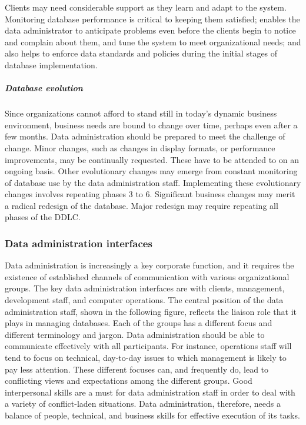 \documentclass[
]{article}
\begin{document}
Clients may need considerable support as they learn and adapt to the
system. Monitoring database performance is critical to keeping them
satisfied; enables the data administrator to anticipate problems even
before the clients begin to notice and complain about them, and tune the
system to meet organizational needs; and also helps to enforce data
standards and policies during the initial stages of database
implementation.

\hypertarget{database-evolution}{%
\subparagraph*{Database evolution}\label{database-evolution}}

Since organizations cannot afford to stand still in today's dynamic
business environment, business needs are bound to change over time,
perhaps even after a few months. Data administration should be prepared
to meet the challenge of change. Minor changes, such as changes in
display formats, or performance improvements, may be continually
requested. These have to be attended to on an ongoing basis. Other
evolutionary changes may emerge from constant monitoring of database use
by the data administration staff. Implementing these evolutionary
changes involves repeating phases 3 to 6. Significant business changes
may merit a radical redesign of the database. Major redesign may require
repeating all phases of the DDLC.

\hypertarget{data-administration-interfaces}{%
\subsubsection*{Data administration interfaces}\label{data-administration-interfaces}}

Data administration is increasingly a key corporate function, and it
requires the existence of established channels of communication with
various organizational groups. The key data administration interfaces
are with clients, management, development staff, and computer
operations. The central position of the data administration staff, shown
in the following figure, reflects the liaison role that it plays in
managing databases. Each of the groups has a different focus and
different terminology and jargon. Data administration should be able to
communicate effectively with all participants. For instance, operations
staff will tend to focus on technical, day-to-day issues to which
management is likely to pay less attention. These different focuses can,
and frequently do, lead to conflicting views and expectations among the
different groups. Good interpersonal skills are a must for data
administration staff in order to deal with a variety of conflict-laden
situations. Data administration, therefore, needs a balance of people,
technical, and business skills for effective execution of its tasks.
\end{document}
